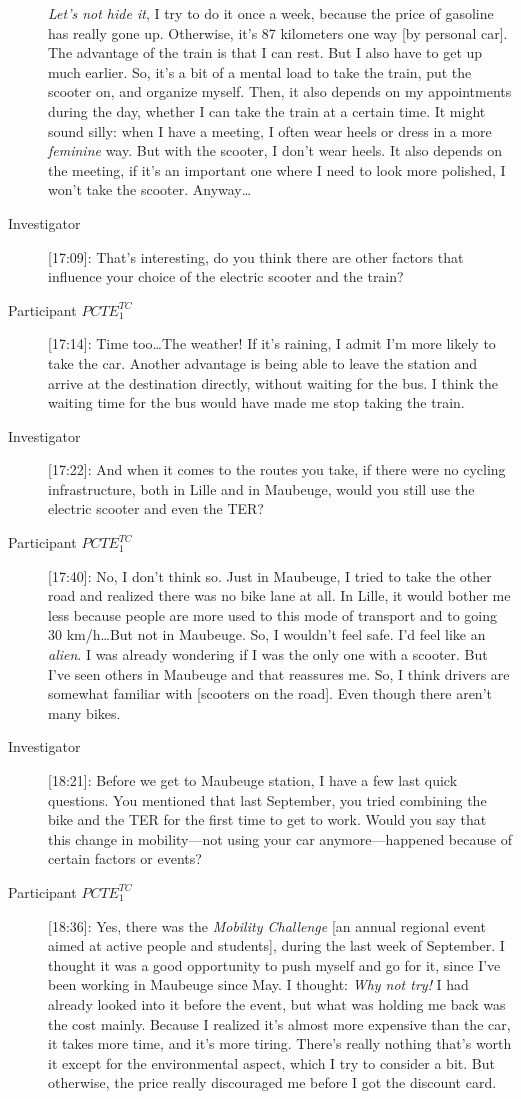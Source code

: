 \begin{description}
    \textsl{Let’s not hide it}, I try to do it once a week, because the price of gasoline has really gone up. Otherwise, it’s 87 kilometers one way [by personal car]. The advantage of the train is that I can rest. But I also have to get up much earlier. So, it’s a bit of a mental load to take the train, put the scooter on, and organize myself. Then, it also depends on my appointments during the day, whether I can take the train at a certain time. It might sound silly: when I have a meeting, I often wear heels or dress in a more \textsl{feminine} way. But with the scooter, I don’t wear heels. It also depends on the meeting, if it’s an important one where I need to look more polished, I won’t take the scooter. Anyway\dots%
    \item[Investigator] [17:09]: That’s interesting, do you think there are other factors that influence your choice of the electric scooter and the train?
    \item[Participant \(PCTE^{TC}_{1}\)] [17:14]: Time too\dots The weather! If it’s raining, I admit I’m more likely to take the car. Another advantage is being able to leave the station and arrive at the destination directly, without waiting for the bus. I think the waiting time for the bus would have made me stop taking the train.
    \item[Investigator] [17:22]: And when it comes to the routes you take, if there were no cycling infrastructure, both in Lille and in Maubeuge, would you still use the electric scooter and even the \acrshort{TER}?
    \item[Participant \(PCTE^{TC}_{1}\)] [17:40]: No, I don’t think so. Just in Maubeuge, I tried to take the other road and realized there was no bike lane at all. In Lille, it would bother me less because people are more used to this mode of transport and to going 30 km/h\dots But not in Maubeuge. So, I wouldn’t feel safe. I’d feel like an \textsl{alien}. I was already wondering if I was the only one with a scooter. But I’ve seen others in Maubeuge and that reassures me. So, I think drivers are somewhat familiar with [scooters on the road]. Even though there aren’t many bikes.
    \item[Investigator] [18:21]: Before we get to Maubeuge station, I have a few last quick questions. You mentioned that last September, you tried combining the bike and the \acrshort{TER} for the first time to get to work. Would you say that this change in mobility—not using your car anymore—happened because of certain factors or events?
    \item[Participant \(PCTE^{TC}_{1}\)] [18:36]: Yes, there was the \textsl{Mobility Challenge} [an annual regional event aimed at active people and students], during the last week of September. I thought it was a good opportunity to push myself and go for it, since I’ve been working in Maubeuge since May. I thought: \textsl{Why not try!} I had already looked into it before the event, but what was holding me back was the cost mainly. Because I realized it’s almost more expensive than the car, it takes more time, and it’s more tiring. There’s really nothing that’s worth it except for the environmental aspect, which I try to consider a bit. But otherwise, the price really discouraged me before I got the discount card.

\end{description}
